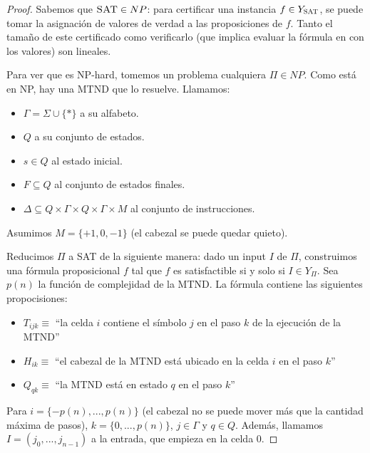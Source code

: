 \documentclass[a4paper]{report}
\begin{document}
\begin{proof}
    Sabemos que $\textsc{SAT} \in NP$: para certificar una instancia $f \in Y_{\textsc{SAT}}$, se puede tomar la asignación de valores de verdad a las proposiciones de $f$. Tanto el tamaño de este certificado como verificarlo (que implica evaluar la fórmula en con los valores) son lineales.
    
    Para ver que es NP-hard, tomemos un problema cualquiera $\Pi \in NP$. Como está en NP, hay una MTND que lo resuelve. Llamamos:
    \begin{itemize}
        \item $\Gamma = \Sigma \cup \{\ast\}$ a su alfabeto.
        \item $Q$ a su conjunto de estados.
        \item $s \in Q$ al estado inicial.
        \item $F \subseteq Q$ al conjunto de estados finales.
        \item $\Delta \subseteq Q \times \Gamma \times Q \times \Gamma \times M$ al conjunto de instrucciones.
    \end{itemize}

    Asumimos $M = \{+1, 0, -1\}$ (el cabezal se puede quedar quieto).

    Reducimos $\Pi$ a SAT de la siguiente manera: dado un input $I$ de $\Pi$, construimos una fórmula proposicional $f$ tal que $f$ es satisfactible si y solo si $I \in Y_{\Pi}$. Sea $p(n)$ la función de complejidad de la MTND. La fórmula contiene las siguientes propocisiones:
    \begin{itemize}
        \item $T_{ijk} \equiv $ ``la celda $i$ contiene el símbolo $j$ en el paso $k$ de la ejecución de la MTND''
        \item $H_{ik} \equiv $ ``el cabezal de la MTND está ubicado en la celda $i$ en el paso $k$''
        \item $Q_{qk} \equiv $ ``la MTND está en estado $q$ en el paso $k$''
    \end{itemize}

    Para $i = \{-p(n), ..., p(n)\}$ (el cabezal no se puede mover más que la cantidad máxima de pasos), $k = \{0, ..., p(n)\}$, $j \in \Gamma$ y $q \in Q$. Además, llamamos $I = (j_0, ..., j_{n - 1})$ a la entrada, que empieza en la celda $0$.


\end{proof}
\end{document}
